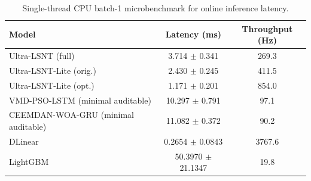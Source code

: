 ﻿\documentclass[review,1p,times]{elsarticle}
\begin{document}
\begin{table}[t]
\centering
\caption{Ramp, tail-error, smoothness, and routing-stability diagnostics on Wind (CN). Values are reported for auditable Ultra-LSNT and DLinear runs.}
\label{tab:ramp_tail_smoothness}
\begingroup
\setlength{\tabcolsep}{3.5pt}
\small
{}
\endgroup
\end{table}

\begin{table}[t]
\centering
\caption{Post-hoc Gaussian calibration baseline on Wind (CN) with nominal 80\% and 90\% intervals.}
\label{tab:prob_gaussian_minimal}
\begingroup
\setlength{\tabcolsep}{4pt}
\small
{}
\endgroup
\end{table}

\begin{table}[t]
\centering
\caption{Single-thread CPU batch-1 microbenchmark for online inference latency.}
\label{tab:cpu_batch1_latency}
\begin{tabular}{lcc}
\toprule
Model & Latency (ms) & Throughput (Hz) \\
\midrule
Ultra-LSNT (full) & 3.714 $\pm$ 0.341 & 269.3 \\
Ultra-LSNT-Lite (orig.) & 2.430 $\pm$ 0.245 & 411.5 \\
Ultra-LSNT-Lite (opt.) & 1.171 $\pm$ 0.201 & 854.0 \\
VMD-PSO-LSTM (minimal auditable) & 10.297 $\pm$ 0.791 & 97.1 \\
CEEMDAN-WOA-GRU (minimal auditable) & 11.082 $\pm$ 0.372 & 90.2 \\
DLinear & 0.2654 $\pm$ 0.0843 & 3767.6 \\
LightGBM & 50.3970 $\pm$ 21.1347 & 19.8 \\
\bottomrule
\end{tabular}
\end{table}
\end{document}
